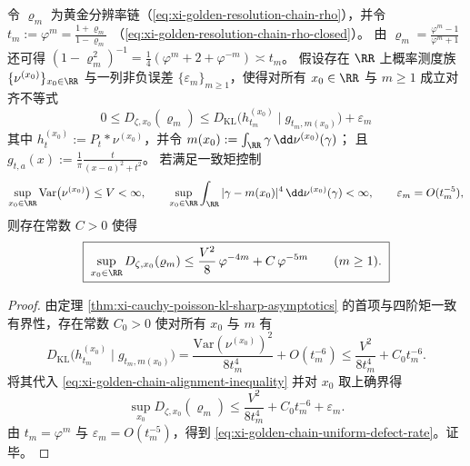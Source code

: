 \begin{proposition}\label{prop:xi-golden-chain-poisson-kl-alignment-rate}
令 \(\varrho_m\) 为黄金分辨率链（\eqref{eq:xi-golden-resolution-chain-rho}），并令
\(
t_m:=\varphi^m=\frac{1+\varrho_m}{1-\varrho_m}
\)
（\eqref{eq:xi-golden-resolution-chain-rho-closed}）。
由 \(\varrho_m=\frac{\varphi^m-1}{\varphi^m+1}\) 还可得
\(
(1-\varrho_m^2)^{-1}=\frac14(\varphi^m+2+\varphi^{-m})\asymp t_m
\)。
假设存在 \(\RR\) 上概率测度族 \(\{\nu^{(x_0)}\}_{x_0\in\RR}\) 与一列非负误差 \(\{\varepsilon_m\}_{m\ge 1}\)，使得对所有 \(x_0\in\RR\) 与 \(m\ge 1\) 成立对齐不等式
\begin{equation}\label{eq:xi-golden-chain-alignment-inequality}
\boxed{\;
0\le D_{\zeta,x_0}(\varrho_m)
\le D_{\mathrm{KL}}\!\bigl(h^{(x_0)}_{t_m}\mid g_{t_m,m(x_0)}\bigr)+\varepsilon_m\;}
\end{equation}
其中
\(
h^{(x_0)}_{t}:=P_t*\nu^{(x_0)}
\)，并令 \(m(x_0):=\int_{\RR}\gamma\,\dd\nu^{(x_0)}(\gamma)\)；
且 \(g_{t,a}(x):=\frac{1}{\pi}\frac{t}{(x-a)^2+t^2}\)。
若满足一致矩控制
\[
\sup_{x_0\in\RR}\mathrm{Var}\bigl(\nu^{(x_0)}\bigr)\le V<\infty,
\qquad
\sup_{x_0\in\RR}\int_{\RR}|\gamma-m(x_0)|^4\,\dd\nu^{(x_0)}(\gamma)<\infty,
\qquad
\varepsilon_m=O(t_m^{-5}),
\]
则存在常数 \(C>0\) 使得
\begin{equation}\label{eq:xi-golden-chain-uniform-defect-rate}
\boxed{\;
\sup_{x_0\in\RR}D_{\zeta,x_0}(\varrho_m)
\le \frac{V^2}{8}\,\varphi^{-4m}+C\,\varphi^{-5m}\qquad(m\ge 1).\;}
\end{equation}
\end{proposition}

\begin{proof}
由定理 \ref{thm:xi-cauchy-poisson-kl-sharp-asymptotics} 的首项与四阶矩一致有界性，存在常数 \(C_0>0\) 使对所有 \(x_0\) 与 \(m\) 有
\[
D_{\mathrm{KL}}\!\bigl(h^{(x_0)}_{t_m}\mid g_{t_m,m(x_0)}\bigr)
=\frac{\mathrm{Var}(\nu^{(x_0)})^2}{8t_m^4}+O(t_m^{-6})
\le \frac{V^2}{8t_m^4}+C_0 t_m^{-6}.
\]
将其代入 \eqref{eq:xi-golden-chain-alignment-inequality} 并对 \(x_0\) 取上确界得
\[
\sup_{x_0}D_{\zeta,x_0}(\varrho_m)
\le \frac{V^2}{8t_m^4}+C_0 t_m^{-6}+\varepsilon_m.
\]
由 \(t_m=\varphi^m\) 与 \(\varepsilon_m=O(t_m^{-5})\)，得到 \eqref{eq:xi-golden-chain-uniform-defect-rate}。证毕。
\end{proof}

